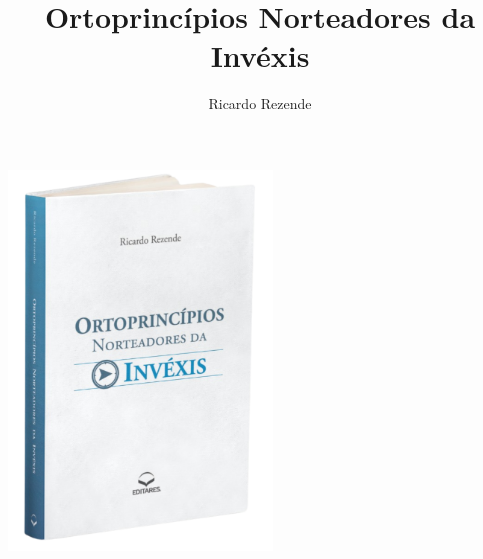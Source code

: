 \documentclass{gescons}
\author{Ricardo Rezende}
\title{Ortoprincípios Norteadores da Invéxis}
\begin{document}
    \makeentrevistatitle

\begin{center}
    \includegraphics[width=7cm]{articles/entrevista/mockups/Ricardo-Rezende-Invexis}
\end{center}
\end{document}
